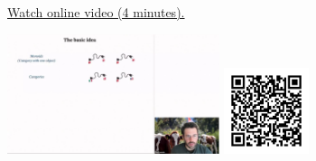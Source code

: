 
\begin{minipage}{10cm}
    \href{https://act4e-spring21.netlify.app/videos/spring2021-operads-a:intro-idea-operad.html}{Watch online video (4 minutes).}
        
    \href{https://act4e-spring21.netlify.app/videos/spring2021-operads-a:intro-idea-operad.html}{\includegraphics[height=3.5cm]{spring2021-operads-a:intro-idea-operad/thumbnails.jpg}}
    \href{https://act4e-spring21.netlify.app/videos/spring2021-operads-a:intro-idea-operad.html}{\includegraphics[height=2.5cm]{spring2021-operads-a:intro-idea-operad/qrcode.png}}
\end{minipage}
